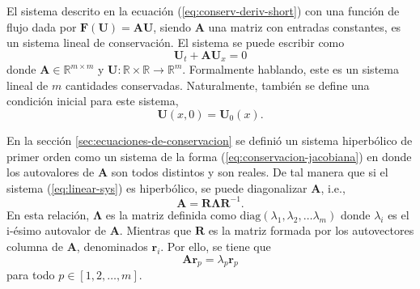 El sistema descrito en la ecuación (\ref{eq:conserv-deriv-short}) con una función de flujo dada por $\mathbf{F}(\mathbf{U}) = \mathbf{A}\mathbf{U}$, siendo $\mathbf{A}$ una matriz con entradas constantes, es un sistema lineal de conservación. El sistema se puede escribir como
\begin{equation}
	\mathbf{U}_t + \mathbf{A}\mathbf{U}_x = 0
	\label{eq:linear-sys}
\end{equation}
donde $\mathbf{A} \in \mathbb{R}^{m \times m}$ y $\mathbf{U} : \mathbb{R} \times \mathbb{R} \rightarrow \mathbb{R}^{m}$. Formalmente hablando, este es un sistema lineal de $m$ cantidades conservadas. Naturalmente, también se define una condición inicial para este sistema,
\begin{equation}
	\mathbf{U}(x,0) = \mathbf{U}_{0}(x).
	\label{eq:cond-inicial-linear-sys}
\end{equation}

En la sección \ref{sec:ecuaciones-de-conservacion} se definió un sistema hiperbólico de primer orden como un sistema de la forma (\ref{eq:conservacion-jacobiana}) en donde los autovalores de $\mathbf{A}$ son todos distintos y son reales. De tal manera que si el sistema (\ref{eq:linear-sys}) es hiperbólico, se puede diagonalizar $\mathbf{A}$, i.e.,
\begin{equation}
	\mathit{\mathbf{A}} = \mathbf{R}\mathbf{\Lambda} \mathbf{R}^{-1}.
	\label{eq:a-diago}
\end{equation}
En esta relación, $\mathbf{\Lambda}$ es la matriz definida como $\text{diag}(\lambda_1, \lambda_2, \dots \lambda_m)$ donde $\lambda_i$ es el i-ésimo autovalor de $\mathbf{A}$. Mientras que $\mathbf{R}$ es la matriz formada por los autovectores columna de $\mathbf{A}$, denominados $\mathbf{r}_i$. Por ello, se tiene que
\begin{equation}
	\mathbf{A}\mathbf{r}_{p}  = \lambda_{p} \mathbf{r}_{p} 
\end{equation}
para todo $p \in [1,2,\dots, m]$.

